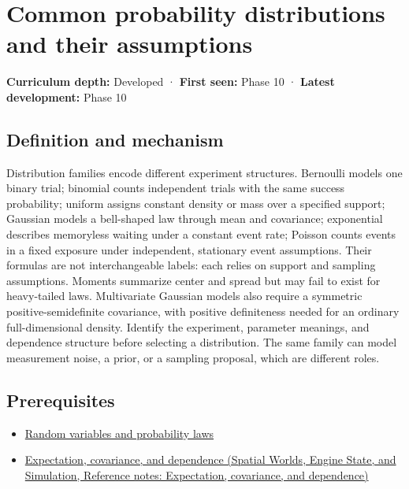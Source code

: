 \hypertarget{appendix-a2360b435383}{}\label{referencestart:appendix-a2360b435383}
\section{Common probability distributions and their assumptions}\label{appendix-a2360b435383-common-probability-distributions-and-their-assumptions}

\textbf{Curriculum depth:} Developed · \textbf{First seen:} Phase 10 · \textbf{Latest development:} Phase 10

\subsection{Definition and mechanism}\label{appendix-a2360b435383-definition-and-mechanism}

Distribution families encode different experiment structures. Bernoulli models one binary trial; binomial counts independent trials with the same success probability; uniform assigns constant density or mass over a specified support; Gaussian models a bell-shaped law through mean and covariance; exponential describes memoryless waiting under a constant event rate; Poisson counts events in a fixed exposure under independent, stationary event assumptions. Their formulas are not interchangeable labels: each relies on support and sampling assumptions. Moments summarize center and spread but may fail to exist for heavy-tailed laws. Multivariate Gaussian models also require a symmetric positive-semidefinite covariance, with positive definiteness needed for an ordinary full-dimensional density. Identify the experiment, parameter meanings, and dependence structure before selecting a distribution. The same family can model measurement noise, a prior, or a sampling proposal, which are different roles.

\subsection{Prerequisites}\label{appendix-a2360b435383-prerequisites}

\begin{itemize}
\tightlist
\item
  \hyperref[appendix-4d0203f7944f]{Random variables and probability laws}
\item
  \href{../05-Spatial-Worlds-Engine-State-and-Simulation/main.pdf\#nameddest=appendix-54c383df9992}{Expectation, covariance, and dependence (Spatial Worlds, Engine State, and Simulation, Reference notes: Expectation, covariance, and dependence)}
\end{itemize}

